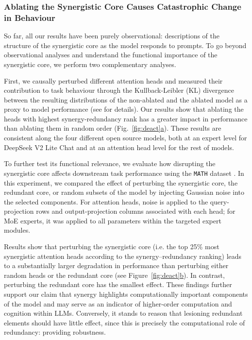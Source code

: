 \documentclass[11pt,a4paper]{ouparticle}
\newcommand\figsubref[2]{\hyperref[#1]{\ref*{#1}#2}}
\begin{document}
\subsubsection*{Ablating the Synergistic Core Causes Catastrophic Change in Behaviour}

So far, all our results have been purely observational: descriptions of the structure of the synergistic core as the model responds to prompts.
To go beyond observational analyses and understand the functional importance of the synergistic core, we perform two complementary analyses. 

First, we causally perturbed different attention heads and measured their contribution to task behaviour through the Kullback-Leibler (KL) divergence between the resulting distributions of the non-ablated and the ablated model as a proxy to model performance (see  for details). Our results show that ablating the heads with highest synergy-redundancy rank has a greater impact in performance than ablating them in random order (Fig.~\figsubref{fig:deact}{a}). These results are consistent along the four different open source models, both at an expert level for DeepSeek V2 Lite Chat and at an attention head level for the rest of models. 

To further test its functional relevance, we evaluate how disrupting the synergistic core affects downstream task performance using the \texttt{MATH} dataset \cite{hendrycks2021measuringmathematicalproblemsolving}.
In this experiment, we compared the effect of perturbing the synergistic core, the redundant core, or random subsets of the model by
injecting Gaussian noise into the selected components. For attention heads, noise is applied to the query-projection rows and output-projection columns associated with each head; for MoE experts, it was applied to all parameters within the targeted expert modules. 
 
Results show that perturbing the synergistic core (i.e. the top 25\% most synergistic attention heads according to the synergy–redundancy ranking) leads to a substantially larger degradation in performance than perturbing either random heads or the redundant core (see Figure~\figsubref{fig:deact}{b}). In contrast, perturbing the redundant core has the smallest effect. These findings further support our claim that synergy highlights computationally important components of the model and may serve as an indicator of higher-order computation and cognition within LLMs. Conversely, it stands to reason that lesioning redundant elements should have little effect, since this is precisely the computational role of redundancy: providing robustness.
\end{document}
